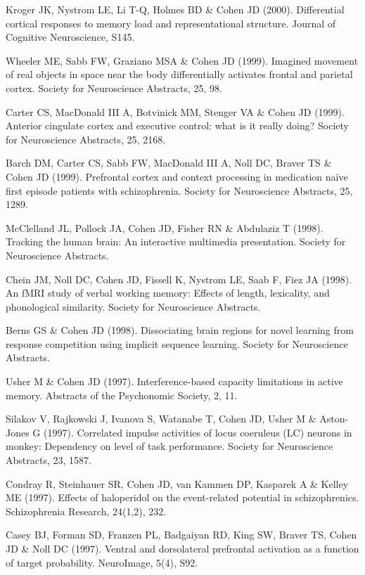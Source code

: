 \documentclass[10 pt]{article}
\begin{document}
Kroger JK, Nystrom LE, Li T-Q, Holmes BD \& Cohen JD (2000). Differential cortical responses to memory load and representational structure. Journal of Cognitive Neuroscience, S145.

Wheeler ME, Sabb FW, Graziano MSA \& Cohen JD (1999). Imagined movement of real objects in space near the body differentially activates frontal and parietal cortex. Society for Neuroscience Abstracts, 25, 98.

Carter CS, MacDonald III A, Botvinick MM, Stenger VA \& Cohen JD (1999). Anterior cingulate cortex and executive control: what is it really doing? Society for Neuroscience Abstracts, 25, 2168.

Barch DM, Carter CS, Sabb FW, MacDonald III A, Noll DC, Braver TS \& Cohen JD (1999). Prefrontal cortex and context processing in medication naïve first episode patients with schizophrenia. Society for Neuroscience Abstracts, 25, 1289.

McClelland JL, Pollock JA, Cohen JD, Fisher RN \& Abdulaziz T (1998). Tracking the human brain: An interactive multimedia presentation. Society for Neuroscience Abstracts.

Chein JM, Noll DC, Cohen JD, Fissell K, Nystrom LE, Saab F, Fiez JA (1998). An fMRI study of verbal working memory: Effects of length, lexicality, and phonological similarity. Society for Neuroscience Abstracts.

Berns GS \& Cohen JD (1998). Dissociating brain regions for novel learning from response competition using implicit sequence learning. Society for Neuroscience Abstracts.

Usher M \& Cohen JD (1997). Interference-based capacity limitations in active memory. Abstracts of the Psychonomic Society, 2, 11.

Silakov V, Rajkowski J, Ivanova S, Watanabe T, Cohen JD, Usher M \& Aston-Jones G (1997). Correlated impulse activities of locus coeruleus (LC) neurons in monkey: Dependency on level of task performance. Society for Neuroscience Abstracts, 23, 1587.

Condray R, Steinhauer SR, Cohen JD, van Kammen DP, Kasparek A \& Kelley ME (1997). Effects of haloperidol on the event-related potential in schizophrenics. Schizophrenia Research, 24(1,2), 232.

Casey BJ, Forman SD, Franzen PL, Badgaiyan RD, King SW, Braver TS, Cohen JD \& Noll DC (1997). Ventral and dorsolateral prefrontal activation as a function of target probability. NeuroImage, 5(4), S92.
\end{document}
